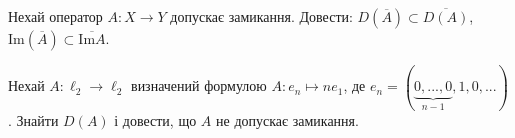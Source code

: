\begin{exercise}
    Нехай оператор $A: X \rightarrow Y$ допускає замикання. Довести:
    $D(\overline{A}) \subset \overline{D(A)}$, $\mathrm{Im}(\overline{A}) \subset 
    \overline{\mathrm{Im}A}$.
\end{exercise}

\begin{exercise}
    Нехай $A: \ell_2 \rightarrow \ell_2$ визначений формулою $A: e_n 
    \mapsto ne_1$, де $e_n = (\underbrace{0, ..., 0}_{n-1}, 1, 0, ...)$. 
    Знайти $D(A)$ і довести, що $A$ не допускає замикання.
\end{exercise}